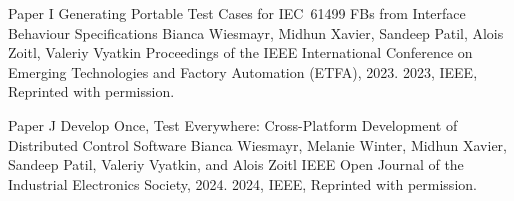 \documentclass[12pt,a4paper,openright,final,twoside]{cseethesis}
\begin{document}
\def\paperheader{Paper I}
\def\papertitle{Generating Portable Test Cases for IEC~61499 FBs from Interface Behaviour Specifications}
\def\paperauthorstring{Bianca Wiesmayr, Midhun Xavier, Sandeep Patil, Alois Zoitl, Valeriy Vyatkin}
\def\referencestring{Proceedings of the IEEE International Conference on Emerging Technologies and Factory Automation (ETFA), 2023.}
\def\copyrightstring{2023, IEEE, Reprinted with permission.}


\makepaperaccepted
  {\paperheader}
  {\papertitle}
  {\paperauthorstring}
  {\referencestring}
  {\copyrightstring}



\def\paperheader{Paper J}
\def\papertitle{Develop Once, Test Everywhere: Cross-Platform Development of Distributed Control Software}
\def\paperauthorstring{Bianca Wiesmayr, Melanie Winter, Midhun Xavier, Sandeep Patil, Valeriy Vyatkin, and Alois Zoitl}
\def\referencestring{IEEE Open Journal of the Industrial Electronics Society, 2024.}
\def\copyrightstring{2024, IEEE, Reprinted with permission.}


\makepaperaccepted
  {\paperheader}
  {\papertitle}
  {\paperauthorstring}
  {\referencestring}
  {\copyrightstring}



\def\paperheader{Paper K}
\def\papertitle{Enhancing Traceability in Flexible Production System: A Blockchain-Powered Approach in IEC 61499 Multi-Agent Control System}
\def\paperauthorstring{Midhun Xavier, Sandeep Patil, Valeriy Vyatkin}
\def\referencestring{Proceedings of the IEEE International Conference on Emerging Technologies and Factory Automation (ETFA), 2024.}
\def\copyrightstring{2024, IEEE, Reprinted with permission.}
\end{document}
